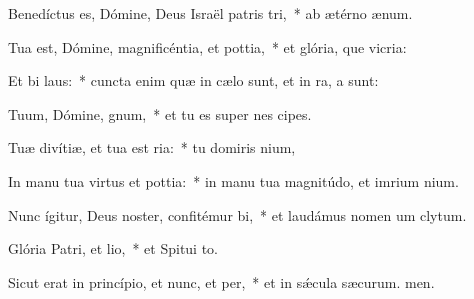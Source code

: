 \item Benedíctus es, Dómine, Deus Israël patris tri,~* ab ætérno  ænum.
\item Tua est, Dómine, magnificéntia, et pottia,~* et glória, que vicria:
\item Et bi laus:~* cuncta enim quæ in cælo sunt, et in ra, a sunt:
\item Tuum, Dómine, gnum,~* et tu es super nes cipes.
\item Tuæ divítiæ, et tua est ria:~* tu domiris nium,
\item In manu tua virtus et pottia:~* in manu tua magnitúdo, et imrium nium.
\item Nunc ígitur, Deus noster, confitémur bi,~* et laudámus nomen um clytum.
\item Glória Patri, et lio,~* et Spitui to.
\item Sicut erat in princípio, et nunc, et per,~* et in sǽcula sæcurum. men.
